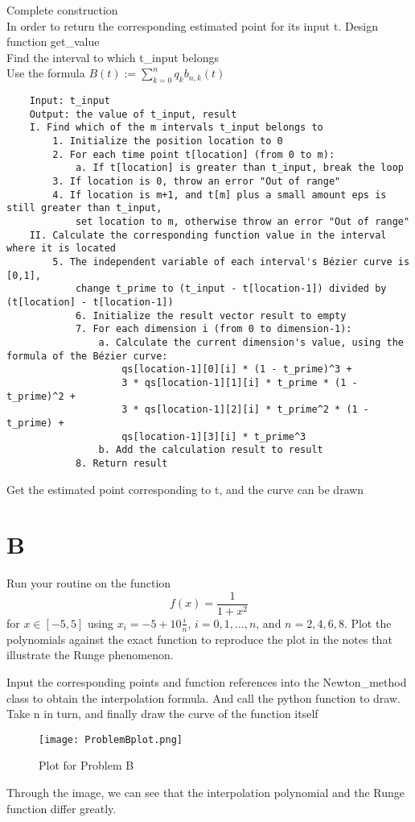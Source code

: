 \documentclass[a4paper]{article}
\begin{document}
Complete construction \\
In order to return the corresponding estimated point for its input t. Design function get\_value \\
Find the interval to which t\_input belongs \\
Use the formula $B(t) := \sum_{k=0}^{n} q_k b_{n,k}(t)$ \\
\begin{verbatim}
    Input: t_input
    Output: the value of t_input, result
    I. Find which of the m intervals t_input belongs to
        1. Initialize the position location to 0
        2. For each time point t[location] (from 0 to m):
            a. If t[location] is greater than t_input, break the loop
        3. If location is 0, throw an error "Out of range"
        4. If location is m+1, and t[m] plus a small amount eps is still greater than t_input, 
            set location to m, otherwise throw an error "Out of range"
    II. Calculate the corresponding function value in the interval where it is located
        5. The independent variable of each interval's Bézier curve is [0,1],
            change t_prime to (t_input - t[location-1]) divided by (t[location] - t[location-1])
            6. Initialize the result vector result to empty
            7. For each dimension i (from 0 to dimension-1):
                a. Calculate the current dimension's value, using the formula of the Bézier curve:
                    qs[location-1][0][i] * (1 - t_prime)^3 +
                    3 * qs[location-1][1][i] * t_prime * (1 - t_prime)^2 +
                    3 * qs[location-1][2][i] * t_prime^2 * (1 - t_prime) +
                    qs[location-1][3][i] * t_prime^3
                b. Add the calculation result to result
            8. Return result
    \end{verbatim}
    Get the estimated point corresponding to t, and the curve can be drawn \\
    
    
    \section*{B}
    Run your routine on the function
    \[
    f(x) = \frac{1}{1 + x^2}
    \]
    for $x \in [-5,5]$ using $x_i = -5 + 10\frac{i}{n}$, $i = 0, 1, \ldots, n$, and $n = 2, 4, 6, 8$. Plot the polynomials against the exact function to reproduce the plot in the notes that illustrate the Runge phenomenon.
    
    Input the corresponding points and function references into the Newton\_method class to obtain the interpolation formula.
    And call the python function to draw. \\
    Take n in turn, and finally draw the curve of the function itself \\
    \begin{figure}[H]
        \centering 
        \texttt{[image: ProblemBplot.png]} 
        \caption{Plot for Problem B} 
        \label{fig:example} 
    \end{figure}
    Through the image, we can see that the interpolation polynomial and the Runge function differ greatly.\\
    
\end{document}
